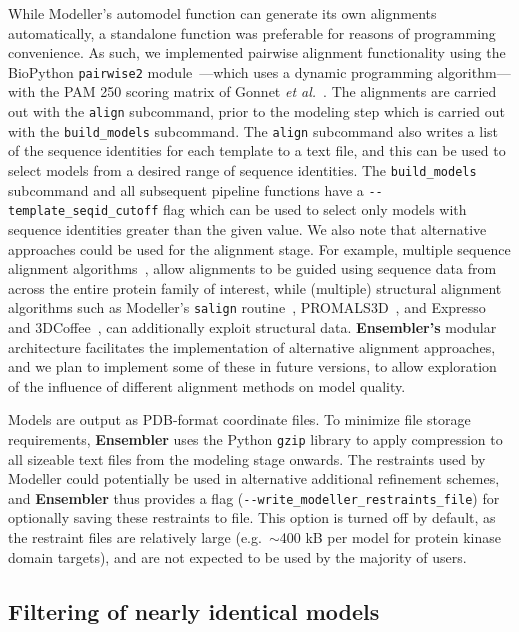 \documentclass[aps,pre,twocolumn,nofootinbib,superscriptaddress,linenumbers]{revtex4-1}
\begin{document}
While Modeller's automodel function can generate its own alignments automatically, a standalone function was preferable for reasons of programming convenience.
As such, we implemented pairwise alignment functionality using the BioPython {\tt pairwise2} module~\cite{cock:2009:biopython}---which uses a dynamic programming algorithm---with the PAM 250 scoring matrix of Gonnet \textit{et al.}~\cite{gonnet:science:1992:exhaustive-matching}.
The alignments are carried out with the {\tt align} subcommand, prior to the modeling step which is carried out with the {\tt build\_models} subcommand.
The {\tt align} subcommand also writes a list of the sequence identities for each template to a text file, and this can be used to select models from a desired range of sequence identities.
The {\tt build\_models} subcommand and all subsequent pipeline functions have a {\tt -{}-template\_seqid\_cutoff} flag which can be used to select only models with sequence identities greater than the given value.
We also note that alternative approaches could be used for the alignment stage.
For example, multiple sequence alignment algorithms~\cite{thompson:2011:msa-review}, allow alignments to be guided using sequence data from across the entire protein family of interest, while (multiple) structural alignment algorithms such as Modeller's {\tt salign} routine~\cite{fiser:prot-sci:2000:modeller,sali:jmb:1993:modeller}, PROMALS3D~\cite{pei:2008:promals3d}, and Expresso and 3DCoffee~\cite{expresso,3dcoffee}, can additionally exploit structural data.
{\bf Ensembler's} modular architecture facilitates the implementation of alternative alignment approaches, and we plan to implement some of these in future versions, to allow exploration of the influence of different alignment methods on model quality.

Models are output as PDB-format coordinate files.
To minimize file storage requirements, {\bf Ensembler} uses the Python {\tt gzip} library to apply compression to all sizeable text files from the modeling stage onwards.
The restraints used by Modeller could potentially be used in alternative additional refinement schemes, and {\bf Ensembler} thus provides a flag ({\tt -{}-write\_modeller\_restraints\_file}) for optionally saving these restraints to file.
This option is turned off by default, as the restraint files are relatively large (e.g.~$\sim$400 kB per model for protein kinase domain targets), and are not expected to be used by the majority of users.

\subsection*{Filtering of nearly identical models}
\end{document}
